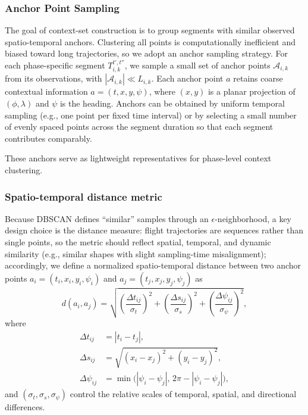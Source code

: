 \documentclass[iicol,pdflatex,sn-basic,Numbered]{sn-jnl}%
\theoremstyle{thmstyleone}%
\theoremstyle{thmstyletwo}%
\theoremstyle{thmstylethree}%
\begin{document}
\subsubsection{Anchor Point Sampling}

The goal of context-set construction is to group segments with similar observed spatio-temporal anchors.
Clustering all points is computationally inefficient and biased toward long trajectories, so we adopt an anchor sampling strategy.
For each phase-specific segment $T^{t',t''}_{i,k}$, we sample a small set of anchor points $\mathcal{A}_{i,k}$ from its observations, with $|\mathcal{A}_{i,k}| \ll L_{i,k}$.
Each anchor point $a$ retains coarse contextual information $a=(t, x, y, \psi)$, where $(x,y)$ is a planar projection of $(\phi,\lambda)$ and $\psi$ is the heading.
Anchors can be obtained by uniform temporal sampling (e.g., one point per fixed time interval) or by selecting a small number of evenly spaced points across the segment duration so that each segment contributes comparably.

These anchors serve as lightweight representatives for phase-level context clustering.

\subsubsection{Spatio-temporal distance metric}

Because DBSCAN defines ``similar'' samples through an $\epsilon$-neighborhood, a key design choice is the distance measure: flight trajectories are sequences rather than single points, so the metric should reflect spatial, temporal, and dynamic similarity (e.g., similar shapes with slight sampling-time misalignment); accordingly, we define a normalized spatio-temporal distance between two anchor points $a_i=(t_i,x_i,y_i,\psi_i)$ and $a_j=(t_j,x_j,y_j,\psi_j)$ as
\begin{equation}
\label{eq:cohort_distance}
d(a_i,a_j)=
\sqrt{\left(\frac{\Delta t_{ij}}{\sigma_t}\right)^2+\left(\frac{\Delta s_{ij}}{\sigma_s}\right)^2+\left(\frac{\Delta\psi_{ij}}{\sigma_{\psi}}\right)^2},
\end{equation}
where
\begin{align}
\Delta t_{ij} &= |t_i-t_j|,\\
\Delta s_{ij} &= \sqrt{(x_i-x_j)^2+(y_i-y_j)^2},\\
\Delta\psi_{ij} &= \min\big(|\psi_i-\psi_j|,\, 2\pi-|\psi_i-\psi_j|\big),
\end{align}
and $(\sigma_t,\sigma_s,\sigma_{\psi})$ control the relative scales of temporal, spatial, and directional differences.
\end{document}
